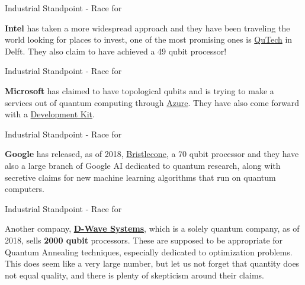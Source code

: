 \documentclass[aspectratio=43]{beamer}
\begin{document}
\begin{frame}{Industrial Standpoint - Race for \q}
    \begin{card}
        \textbf{Intel} has taken a more widespread approach and they have been traveling the world looking for places to invest, one of the most promising ones is \href{https://qutech.nl/}{QuTech} in Delft. They also claim to have achieved a 49 qubit processor!
    \end{card}
\pagenumber
\end{frame}

\begin{frame}{Industrial Standpoint - Race for \q}
    \begin{card}
        \textbf{Microsoft} has claimed to have topological qubits and is trying to make a services out of quantum computing through \href{https://azure.microsoft.com/en-us/}{Azure}. They have also come forward with a \href{https://www.microsoft.com/en-us/quantum/development-kit}{\q Development Kit}.
    \end{card}
\pagenumber
\end{frame}


\begin{frame}{Industrial Standpoint - Race for \q}
    \begin{card}
        \textbf{Google} has released, as of 2018, \href{https://techcrunch.com/2018/03/05/googles-new-bristlecone-processor-brings-it-one-step-closer-to-quantum-supremacy/}{Bristlecone}, a 70 qubit processor and they have also a large branch of Google AI dedicated to quantum research, along with secretive claims for new machine learning algorithms that run on quantum computers.
    \end{card}
\pagenumber
\end{frame}


\begin{frame}{Industrial Standpoint - Race for \q}
    \begin{card}
        Another company, \href{https://www.dwavesys.com/quantum-computing}{\textbf{D-Wave Systems}}, which is a solely quantum company, as of 2018, sells \textbf{2000 qubit} processors. These are supposed to be appropriate for Quantum Annealing techniques, especially dedicated to optimization problems. This does seem like a very large number, but let us not forget that quantity does not equal quality, and there is plenty of skepticism around their claims.
    \end{card}
\pagenumber
\end{frame}
\end{document}

